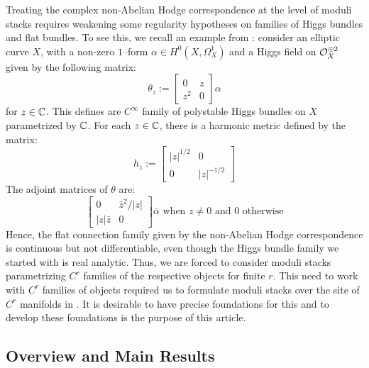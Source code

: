 \documentclass[11pt]{amsart}
\begin{document}
Treating the complex non-Abelian Hodge correspondence at the level of moduli stacks requires
weakening some regularity hypotheses on families of Higgs bundles and flat bundles.
To see this, we recall an example from \cite[Proposition 14.4]{AR26b}:
consider an elliptic curve $X$, with a non-zero $1$--form
$\alpha \in H^0(X, \Omega^1_X)$ and a Higgs field on $\mathcal{O}_X^{\oplus 2}$ given by the following
matrix:
\[
\theta_z := \begin{bmatrix}
0 & z \\
z^2 & 0
\end{bmatrix} \alpha
\]
for $z \in \mathbb{C}$. This defines are $C^\infty$ family of polystable Higgs bundles on $X$ parametrized
by $\mathbb{C}$. For each $z \in \mathbb{C}$, there is a harmonic metric defined by the matrix:
\[
h_z := \begin{bmatrix}
|z|^{1/2} & 0 \\
0 & |z|^{-1/2}
\end{bmatrix}
\]
The adjoint matrices of $\theta$ are:
\[
\begin{bmatrix}
0 & \bar{z}^2/|z| \\
|z|\bar{z} & 0
\end{bmatrix} \bar{\alpha} \text{ when $z \neq 0$ and $0$ otherwise}
\]
Hence, the flat connection family given by the non-Abelian Hodge correspondence is continuous
but not differentiable, even though the Higgs bundle family we started with is real analytic.
Thus, we are forced to consider moduli stacks parametrizing $C^r$ families of the respective objects
for finite $r$.
This need to work with $C^r$ families of objects required us to formulate moduli stacks over the
site of $C^r$ manifolds in \cite[\S 11]{AR26b}.
It is desirable to have precise foundations for this and to develop these foundations is the purpose
of this article.

\subsection{Overview and Main Results}
\end{document}
